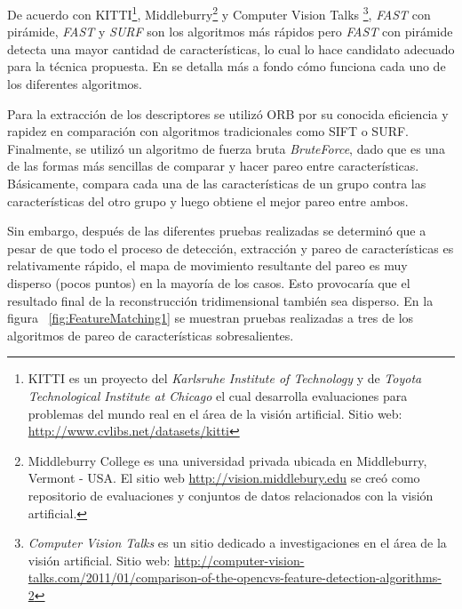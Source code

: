 De acuerdo con KITTI\footnote{KITTI es un proyecto del \textit{Karlsruhe Institute of Technology} y de \textit{Toyota Technological Institute at Chicago} el cual desarrolla evaluaciones para problemas del mundo real en el \'{a}rea de la visi\'{o}n artificial. Sitio web: \url{http://www.cvlibs.net/datasets/kitti}}, Middleburry\footnote{Middleburry College es una universidad privada ubicada en Middleburry, Vermont - USA. El sitio web \url{http://vision.middlebury.edu} se cre\'{o} como repositorio de evaluaciones y conjuntos de datos relacionados con la visi\'{o}n artificial.} y Computer Vision Talks \footnote{\textit{Computer Vision Talks} es un sitio dedicado a investigaciones en el \'{a}rea de la visi\'{o}n artificial. Sitio web: \url{http://computer-vision-talks.com/2011/01/comparison-of-the-opencvs-feature-detection-algorithms-2}}, \textit{FAST} con pir\'{a}mide, \textit{FAST} y \textit{SURF} son los algoritmos m\'{a}s r\'{a}pidos pero \textit{FAST} con pir\'{a}mide detecta una mayor cantidad de caracter\'{i}sticas, lo cual lo hace candidato adecuado para la t\'{e}cnica propuesta. En \cite{Tuytelaars_Mikolajczyk_2007} se detalla m\'{a}s a fondo c\'{o}mo funciona cada uno de los diferentes algoritmos.

Para la extracci\'{o}n de los descriptores se utiliz\'{o} ORB \cite{Rublee_Rabaud_Konolige_Bradski_2011} por su conocida eficiencia y rapidez en comparaci\'{o}n con algoritmos tradicionales como SIFT o SURF. Finalmente, se utiliz\'{o} un algoritmo de fuerza bruta \textit{BruteForce}, dado que es una de las formas m\'{a}s sencillas de comparar y hacer pareo entre caracter\'{i}sticas. B\'{a}sicamente, compara cada una de las caracter\'{i}sticas de un grupo contra las caracter\'{i}sticas del otro grupo y luego obtiene el mejor pareo entre ambos.

Sin embargo, despu\'{e}s de las diferentes pruebas realizadas se determin\'{o} que a pesar de que todo el proceso de detecci\'{o}n, extracci\'{o}n y pareo de caracter\'{i}sticas es relativamente r\'{a}pido, el mapa de movimiento resultante del pareo es muy disperso (pocos puntos) en la mayor\'{i}a de los casos. Esto provocar\'{i}a que el resultado final de la reconstrucci\'{o}n tridimensional tambi\'{e}n sea disperso. En la figura ~\ref{fig:FeatureMatching1} se muestran pruebas realizadas a tres de los algoritmos de pareo de caracter\'{i}sticas sobresalientes.


